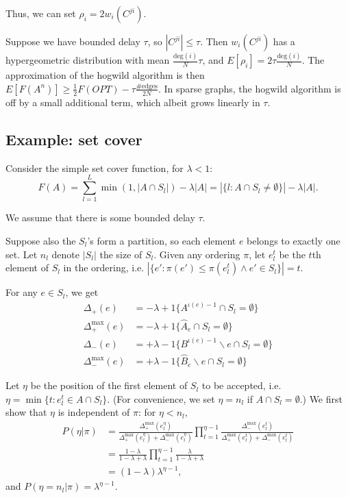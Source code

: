 Thus, we can set $\rho_i = 2w_i(C^{ji})$.

Suppose we have bounded delay $\tau$, so $|C^{ji}| \leq \tau$.
Then $w_i(C^{ji})$ has a hypergeometric distribution with mean $\frac{\text{deg}(i)}{N}\tau$, and $E[\rho_i] = 2\tau\frac{\text{deg}(i)}{N}$.
The approximation of the hogwild algorithm is then $E[F(A^n)] \geq \frac{1}{2} F(OPT) - \tau\frac{\#\text{edges}}{2N}$.
In sparse graphs, the hogwild algorithm is off by a small additional term, which albeit grows linearly in $\tau$.



\subsection{Example: set cover}

Consider the simple set cover function, for $\lambda < 1$:
\[ F(A) = \sum_{l=1}^L \min(1,|A\cap S_l|) - \lambda|A| = |\{l: A\cap S_l \neq\emptyset\}| - \lambda|A|.\]

We assume that there is some bounded delay $\tau$.

Suppose also the $S_l$'s form a partition, so each element $e$ belongs to exactly one set.
Let $n_l$ denote $|S_l|$ the size of $S_l$.
Given any ordering $\pi$, let $e_l^t$ be the $t$th element of $S_l$ in the ordering, i.e. $|\{e': \pi(e') \leq \pi(e_l^t) \wedge e'\in S_l\}| = t$.

For any $e \in S_l$, we get 
\begin{align*}
\Delta_+       (e) &= -\lambda + 1\{A^{\iota(e)-1}\cap S_l = \emptyset\}\\
\Delta_+^{\max}(e) &= -\lambda + 1\{\hat{A}_e\cap S_l = \emptyset\}\\
\Delta_-       (e) &= +\lambda - 1\{B^{\iota(e)-1}\backslash e\cap S_l = \emptyset\}\\
\Delta_-^{\max}(e) &= +\lambda - 1\{\hat{B}_e\backslash e\cap S_l = \emptyset\}
\end{align*}

Let $\eta$ be the position of the first element of $S_l$ to be accepted, i.e. $\eta = \min\{t : e_l^t \in A \cap S_l\}$.
(For convenience, we set $\eta = n_l$ if $A \cap S_l = \emptyset$.)
We first show that $\eta$ is independent of $\pi$: for $\eta < n_l$,
\begin{align*}
P(\eta|\pi)
&= \frac{\Delta_+^{\max}(e_l^\eta)}{\Delta_+^{\max}(e_l^\eta) + \Delta_-^{\max}(e_l^\eta)} \prod_{t=1}^{\eta-1} \frac{\Delta_-^{\max}(e_l^t)}{\Delta_+^{\max}(e_l^t) + \Delta_-^{\max}(e_l^t)}\\
&= \frac{1-\lambda}{1-\lambda+\lambda} \prod_{t=1}^{\eta-1} \frac{\lambda}{1-\lambda+\lambda}\\
&= (1-\lambda)\lambda^{\eta-1},
\end{align*}
and $P(\eta=n_l | \pi) = \lambda^{\eta-1}$.

